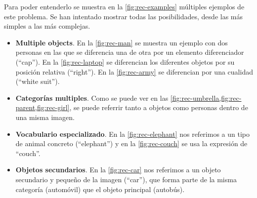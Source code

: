 Para poder entenderlo se muestra en la \vref{fig:rec-examples} múltiples
ejemplos de este problema. Se han intentado mostrar todas las posibilidades,
desde las más simples a las más complejas.
\begin{itemize}
  \item \textbf{Multiple objects}. En la \vref{fig:rec-man} se muestra un
  ejemplo con dos personas en las que se diferencia una de otra por un elemento
  diferenciador (``cap''). En la \vref{fig:rec-laptop} se diferencian los
  diferentes objetos por su posición relativa (``right''). En la
  \vref{fig:rec-army} se diferencian por una cualidad (``white suit'').
  \item \textbf{Categorías multiples}. Como se puede ver en las
  \vref{fig:rec-umbrella,fig:rec-parent,fig:rec-girl}, se puede referrir tanto
  a objetos como personas dentro de una misma imagen.
  \item \textbf{Vocabulario especializado}. En la \vref{fig:rec-elephant} nos
  referimos a un tipo de animal concreto (``elephant'') y en la
  \vref{fig:rec-couch} se usa la expresión de ``couch''.
  \item \textbf{Objetos secundarios}. En la \vref{fig:rec-car} nos referimos a
  un objeto secundario y pequeño de la imagen (``car''), que forma parte de la
  misma categoría (automóvil) que el objeto principal (autobús).
\end{itemize}

